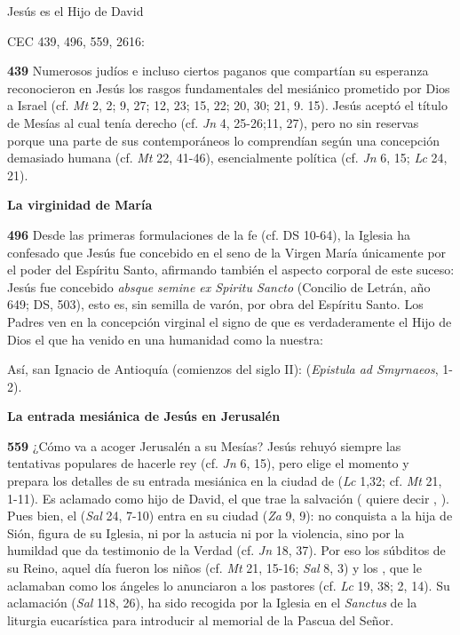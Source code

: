 \begin{body}
\begin{body}
Jesús es el Hijo de David

CEC 439, 496, 559, 2616:

\textbf{439} Numerosos judíos e incluso ciertos paganos que compartían su esperanza reconocieron en Jesús los rasgos fundamentales del mesiánico  prometido por Dios a Israel (cf. \emph{Mt} 2, 2; 9, 27; 12, 23; 15, 22; 20, 30; 21, 9. 15). Jesús aceptó el título de Mesías al cual tenía derecho (cf. \emph{Jn} 4, 25-26;11, 27), pero no sin reservas porque una parte de sus contemporáneos lo comprendían según una concepción demasiado humana (cf. \emph{Mt} 22, 41-46), esencialmente política (cf. \emph{Jn} 6, 15; \emph{Lc} 24, 21).

\textbf{La virginidad de María}

\textbf{496} Desde las primeras formulaciones de la fe (cf. DS 10-64), la Iglesia ha confesado que Jesús fue concebido en el seno de la Virgen María únicamente por el poder del Espíritu Santo, afirmando también el aspecto corporal de este suceso: Jesús fue concebido \emph{absque semine ex Spiritu Sancto} (Concilio de Letrán, año 649; DS, 503), esto es, sin semilla de varón, por obra del Espíritu Santo. Los Padres ven en la concepción virginal el signo de que es verdaderamente el Hijo de Dios el que ha venido en una humanidad como la nuestra:

Así, san Ignacio de Antioquía (comienzos del siglo II):  (\emph{Epistula ad Smyrnaeos}, 1-2).

\textbf{La entrada mesiánica de Jesús en Jerusalén}

\textbf{559} ¿Cómo va a acoger Jerusalén a su Mesías? Jesús rehuyó siempre las tentativas populares de hacerle rey (cf. \emph{Jn} 6, 15), pero elige el momento y prepara los detalles de su entrada mesiánica en la ciudad de  (\emph{Lc} 1,32; cf. \emph{Mt} 21, 1-11). Es aclamado como hijo de David, el que trae la salvación ( quiere decir , ). Pues bien, el  (\emph{Sal} 24, 7-10) entra en su ciudad  (\emph{Za} 9, 9): no conquista a la hija de Sión, figura de su Iglesia, ni por la astucia ni por la violencia, sino por la humildad que da testimonio de la Verdad (cf. \emph{Jn} 18, 37). Por eso los súbditos de su Reino, aquel día fueron los niños (cf. \emph{Mt} 21, 15-16; \emph{Sal} 8, 3) y los , que le aclamaban como los ángeles lo anunciaron a los pastores (cf. \emph{Lc} 19, 38; 2, 14). Su aclamación  (\emph{Sal} 118, 26), ha sido recogida por la Iglesia en el \emph{Sanctus} de la liturgia eucarística para introducir al memorial de la Pascua del Señor.


\end{body}
\end{body}
